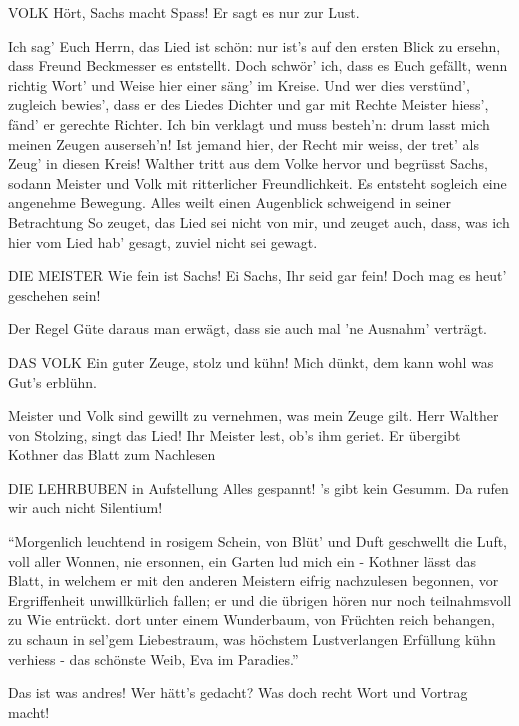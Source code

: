 \begin{drama}
VOLK
Hört, Sachs macht Spass! Er sagt es nur zur Lust.

\Sachsspeaks
Ich sag' Euch Herrn, das Lied ist schön:
nur ist's auf den ersten Blick zu ersehn,
dass Freund Beckmesser es entstellt.
Doch schwör' ich, dass es Euch gefällt,
wenn richtig Wort' und Weise
hier einer säng' im Kreise.
Und wer dies verstünd', zugleich bewies',
dass er des Liedes Dichter
und gar mit Rechte Meister hiess',
fänd' er gerechte Richter.
Ich bin verklagt und muss besteh'n:
drum lasst mich meinen Zeugen auserseh'n!
Ist jemand hier, der Recht mir weiss,
der tret' als Zeug' in diesen Kreis!
Walther tritt aus dem Volke hervor und begrüsst Sachs, sodann Meister und Volk mit ritterlicher Freundlichkeit. Es entsteht sogleich eine angenehme Bewegung. Alles weilt einen Augenblick schweigend in seiner Betrachtung
So zeuget, das Lied sei nicht von mir,
und zeuget auch, dass, was ich hier
vom Lied hab' gesagt, zuviel nicht sei gewagt.

DIE MEISTER
Wie fein ist Sachs! Ei Sachs, Ihr seid gar fein!
Doch mag es heut' geschehen sein!

\Sachsspeaks
Der Regel Güte daraus man erwägt,
dass sie auch mal 'ne Ausnahm' verträgt.

DAS VOLK
Ein guter Zeuge, stolz und kühn!
Mich dünkt, dem kann wohl was Gut's erblühn.

\Sachsspeaks
Meister und Volk sind gewillt
zu vernehmen, was mein Zeuge gilt.
Herr Walther von Stolzing, singt das Lied!
Ihr Meister lest, ob's ihm geriet.
Er übergibt Kothner das Blatt zum Nachlesen

DIE LEHRBUBEN
in Aufstellung
Alles gespannt! 's gibt kein Gesumm.
Da rufen wir auch nicht Silentium!

\Waltherspeaks
{}

``Morgenlich leuchtend in rosigem Schein,
von Blüt' und Duft geschwellt die Luft,
voll aller Wonnen, nie ersonnen,
ein Garten lud mich ein -
Kothner lässt das Blatt, in welchem er mit den anderen Meistern eifrig nachzulesen begonnen, vor Ergriffenheit unwillkürlich fallen; er und die übrigen hören nur noch teilnahmsvoll zu
Wie entrückt.
dort unter einem Wunderbaum,
von Früchten reich behangen,
zu schaun in sel'gem Liebestraum,
was höchstem Lustverlangen
Erfüllung kühn verhiess -
das schönste Weib, Eva im Paradies.''


Das ist was andres! Wer hätt's gedacht?
Was doch recht Wort und Vortrag macht!


\end{drama}
